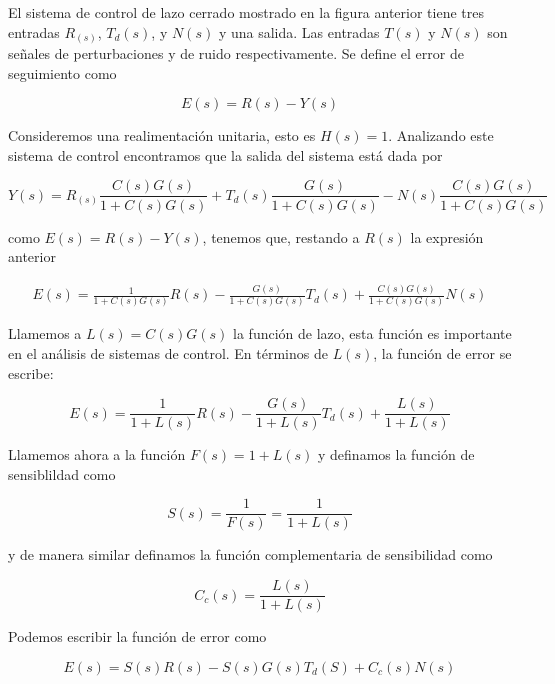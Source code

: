 El sistema de control de lazo cerrado mostrado en la figura anterior tiene tres entradas $R_(s)$, $T_d(s)$, y $N(s)$ y una salida. Las entradas $T(s)$ y $N(s)$ son señales de perturbaciones y de ruido respectivamente. Se define el error de seguimiento como

\begin{equation*}
E(s) = R(s) - Y(s)
\end{equation*}

Consideremos una realimentación unitaria, esto es $H(s) = 1$. Analizando este sistema de control encontramos que la salida del sistema está dada por

\begin{equation*}
Y(s) = R_(s) \frac{C(s)G(s)}{1 + C(s)G(s)} + T_d(s) \frac{G(s)}{1 + C(s)G(s)} - N(s) \frac{C(s)G(s)}{1 + C(s)G(s)}
\end{equation*}

como $E(s) = R(s) - Y(s)$, tenemos que, restando a $R(s)$ la expresión anterior

\begin{eqnarray*}
E(s) = \frac{1}{1 + C(s)G(s)}R(s) - \frac{G(s)}{1 + C(s)G(s)} T_d(s) + \frac{C(s)G(s)}{1 + C(s)G(s)} N(s)
\end{eqnarray*}

Llamemos a $L(s)=C(s)G(s)$ la función de lazo, esta función es importante en el análisis de sistemas de control. En términos de $L(s)$, la función de error se escribe:

\begin{equation*}
E(s) = \frac{1}{1+L(s)} R(s) - \frac{G(s)}{1+ L(s)}T_d(s) + \frac{L(s)}{1+L(s)}
\end{equation*}

Llamemos ahora a la función $F(s) = 1 + L(s)$ y definamos la función de sensiblildad como

\begin{equation*}
S(s) = \frac{1}{F(s)} = \frac{1}{1+L(s)}
\end{equation*}

y de manera similar definamos la función complementaria de sensibilidad como

\begin{equation*}
C_c(s) = \frac{L(s)}{1+L(s)}
\end{equation*}

Podemos escribir la función de error como

\begin{equation*}
E(s) = S(s) R(s) - S(s) G(s) T_d(S) + C_c(s) N(s)
\end{equation*}

